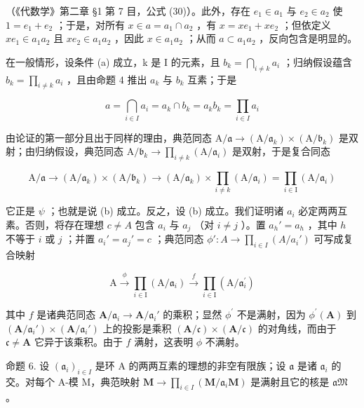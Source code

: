 （《代数学》第二章 §1 第 7 目，公式 (30)）。此外，存在 \(e_1 \in a_1\) 与 \(e_2 \in a_2\) 使 \(1 = e_1 + e_2\) ；于是，对所有 \(x \in a = a_1 \cap a_2\) ，有 \(x = xe_1 + xe_2\) ；但依定义 \(xe_1 \in a_1a_2\) 且 \(xe_2 \in a_1a_2\) ，因此 \(x \in a_1a_2\) ；从而 \(a \subset a_1a_2\) ，反向包含是明显的。

在一般情形，设条件 (a) 成立，k 是 I 的元素，且 \(b_{k} = \bigcap_{i \neq k} a_{i}\) ；归纳假设蕴含 \(b_{k} = \prod_{i \neq k} a_{i}\) ，且由命题 4 推出 \(a_{k}\) 与 \(b_{k}\) 互素；于是

\[
a = \bigcap_ {i \in I} a _ {i} = a _ {k} \cap b _ {k} = a _ {k} b _ {k} = \prod_ {i \in I} a _ {i}
\]

由论证的第一部分且出于同样的理由，典范同态 \(\mathrm{A}/\mathfrak{a}\to(\mathrm{A}/\mathfrak{a}_{k})\times(\mathrm{A}/\mathfrak{b}_{k})\) 是双射；由归纳假设，典范同态 \(\mathrm{A}/\mathfrak{b}_{k}\to\prod_{i\neq k}(\mathrm{A}/\mathfrak{a}_{i})\) 是双射，于是复合同态

\[
\mathrm{A} / \mathfrak {a} \rightarrow (\mathrm{A} / \mathfrak {a} _ {k}) \times (\mathrm{A} / \mathfrak {b} _ {k}) \rightarrow (\mathrm{A} / \mathfrak {a} _ {k}) \times \prod_ {i \neq k} (\mathrm{A} / \mathfrak {a} _ {i}) = \prod_ {i \in \mathrm{I}} (\mathrm{A} / \mathfrak {a} _ {i})
\]

它正是 \(\psi\) ；也就是说 (b) 成立。反之，设 (b) 成立。我们证明诸 \(a_i\) 必定两两互素。否则，将存在理想 \(c \neq A\) 包含 \(a_i\) 与 \(a_j\) （对 \(i \neq j\) ）。置 \(a_h' = a_h\) ，其中 \(h\) 不等于 \(i\) 或 \(j\) ；并置 \(a_i' = a_j' = c\) ；典范同态 \(\phi': A \to \prod_{i \in I} (A / a_i')\) 可写成复合映射

\[
\mathrm{A} \xrightarrow {\phi} \prod_ {i \in \mathrm{I}} (\mathrm{A} / \mathfrak {a} _ {i}) \xrightarrow {f} \prod_ {i \in \mathrm{I}} (\mathrm{A} / \mathfrak {a} _ {i} ^ {\prime})
\]

其中 \(f\) 是诸典范同态 \(\mathbf{A} / \mathfrak{a}_i\to \mathbf{A} / \mathfrak{a}_i'\) 的乘积；显然 \(\phi^{\prime}\) 不是满射，因为 \(\phi^{\prime}(\mathbf{A})\) 到 \((\mathbf{A} / \mathfrak{a}_i')\times (\mathbf{A} / \mathfrak{a}_i')\) 上的投影是乘积 \((\mathbf{A} / \mathfrak{c})\times (\mathbf{A} / \mathfrak{c})\) 的对角线，而由于 \(\mathfrak{c}\neq \mathbf{A}\) 它异于该乘积。由于 \(f\) 满射，这表明 \(\phi\) 不满射。

命题 6. 设 \((\mathfrak{a}_i)_{i\in I}\) 是环 A 的两两互素的理想的非空有限族；设 \(\mathfrak{a}\) 是诸 \(\mathfrak{a}_i\) 的交。对每个 A-模 M，典范映射 \(\mathbf{M} \to \prod_{i\in I} (\mathbf{M} / \mathfrak{a}_i\mathbf{M})\) 是满射且它的核是 \(\mathfrak{aM}\) 。

